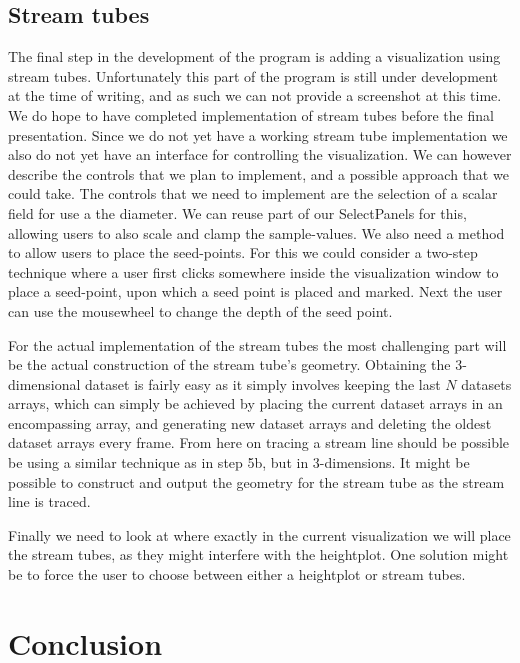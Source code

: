 \documentclass[a4paper,11pt,twoside]{report}
\begin{document}
	\section{Stream tubes}
		The final step in the development of the program is adding a visualization using stream tubes. Unfortunately this part of the program is still under development at the time of writing, and as such we can not provide a screenshot at this time. We do hope to have completed implementation of stream tubes before the final presentation.
		Since we do not yet have a working stream tube implementation we also do not yet have an interface for controlling the visualization. We can however describe the controls that we plan to implement, and a possible approach that we could take. The controls that we need to implement are the selection of a scalar field for use a the diameter. We can reuse part of our SelectPanels for this, allowing users to also scale and clamp the sample-values. We also need a method to allow users to place the seed-points. For this we could consider a two-step technique where a user first clicks somewhere inside the visualization window to place a seed-point, upon which a seed point is placed and marked. Next the user can use the mousewheel to change the depth of the seed point.

		For the actual implementation of the stream tubes the most challenging part will be the actual construction of the stream tube's geometry. Obtaining the 3-dimensional dataset is fairly easy as it simply involves keeping the last $N$ datasets arrays, which can simply be achieved by placing the current dataset arrays in an encompassing array, and generating new dataset arrays and deleting the oldest dataset arrays every frame. From here on tracing a stream line should be possible be using a similar technique as in step 5b, but in 3-dimensions. It might be possible to construct and output the geometry for the stream tube as the stream line is traced.

		Finally we need to look at where exactly in the current visualization we will place the stream tubes, as they might interfere with the heightplot. One solution might be to force the user to choose between either a heightplot or stream tubes.
\chapter{Conclusion}
\end{document}
